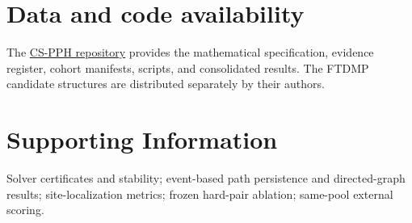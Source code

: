 \documentclass[11pt]{article}
\begin{document}
\section*{Data and code availability}
The \href{https://github.com/Neabigmo/GSPH}{CS-PPH repository} provides the mathematical specification, evidence register, cohort manifests, scripts, and consolidated results. The FTDMP candidate structures are distributed separately by their authors\citep{ftdmpdata}.

\section*{Supporting Information}
Solver certificates and stability; event-based path persistence and directed-graph results; site-localization metrics; frozen hard-pair ablation; same-pool external scoring.



\end{document}
